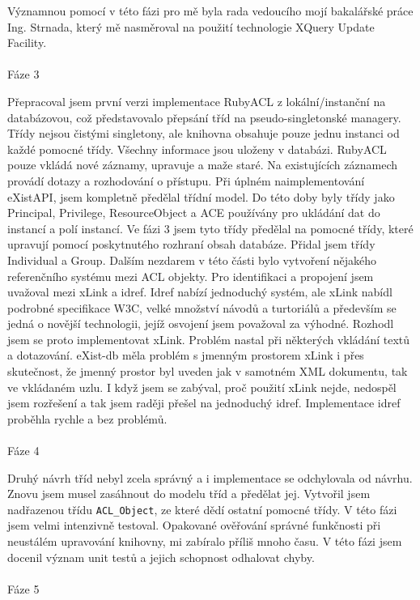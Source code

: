 Významnou pomocí v této fázi pro mě byla rada vedoucího mojí bakalářské práce Ing. Strnada, který mě nasměroval na použití technologie XQuery Update Facility.
\\
\\
\noindent Fáze 3

\noindent Přepracoval jsem první verzi implementace RubyACL z lokální/instanční na databázovou, což představovalo přepsání tříd na pseudo-singletonské managery. Třídy nejsou čistými singletony, ale knihovna obsahuje pouze jednu instanci od každé pomocné třídy. Všechny informace jsou uloženy v databázi. RubyACL pouze vkládá nové záznamy, upravuje a maže staré. Na existujících záznamech provádí dotazy a rozhodování o přístupu. Při úplném naimplementování eXistAPI, jsem kompletně předělal třídní model. Do této doby byly třídy jako Principal, Privilege, ResourceObject a ACE používány pro ukládání dat do instancí a polí instancí. Ve fázi 3 jsem tyto třídy předělal na pomocné třídy, které upravují pomocí poskytnutého rozhraní obsah databáze. Přidal jsem třídy Individual a Group. Dalším nezdarem v této části bylo vytvoření nějakého referenčního systému mezi ACL objekty.  Pro identifikaci a propojení jsem uvažoval mezi xLink a idref. Idref nabízí jednoduchý systém, ale xLink nabídl podrobné specifikace W3C, velké množství návodů a turtoriálů a především se jedná o novější technologii, jejíž osvojení jsem považoval za výhodné. Rozhodl jsem se proto implementovat xLink. Problém nastal při některých vkládání textů a dotazování. eXist-db měla problém s jmenným prostorem xLink i přes skutečnost, že jmenný prostor byl uveden jak v samotném XML dokumentu, tak ve vkládaném uzlu. I když jsem se zabýval, proč použití xLink nejde, nedospěl jsem rozřešení a tak jsem raději přešel na jednoduchý idref. Implementace idref proběhla rychle a bez problémů.
\\
\\
\noindent Fáze 4

\noindent Druhý návrh tříd nebyl zcela správný a i implementace se odchylovala od návrhu. Znovu jsem musel zasáhnout do modelu tříd a předělat jej. Vytvořil jsem nadřazenou třídu \verb|ACL_Object|, ze které dědí ostatní pomocné třídy. V této fázi jsem velmi intenzivně testoval. Opakované ověřování správné funkčnosti při neustálém upravování knihovny, mi zabíralo příliš mnoho času. V této fázi jsem docenil význam unit testů a jejich schopnost odhalovat chyby.
\\
\\
\noindent Fáze 5

